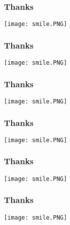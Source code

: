 \documentclass{beamer}
\begin{document}
\begin{frame}
\frametitle{Thanks}

\texttt{[image: smile.PNG]}
\end{frame}
\begin{frame}
\frametitle{Thanks}

\texttt{[image: smile.PNG]}
\end{frame}
\begin{frame}
\frametitle{Thanks}

\texttt{[image: smile.PNG]}
\end{frame}
\begin{frame}
\frametitle{Thanks}
\texttt{[image: smile.PNG]}
\end{frame}
\begin{frame}
\frametitle{Thanks}
\texttt{[image: smile.PNG]}
\end{frame}
\begin{frame}
\frametitle{Thanks}
\texttt{[image: smile.PNG]}
\end{frame}
\end{document}
